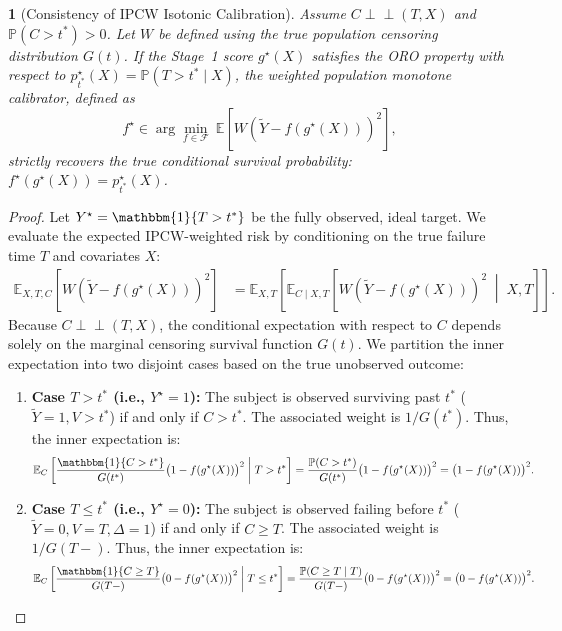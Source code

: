 \documentclass[11pt]{article}
\theoremstyle{plain}
\theoremstyle{plain}
\theoremstyle{plain}
\theoremstyle{plain}
\newtheorem{theorem}{\protect\theoremname}
\theoremstyle{plain}
\theoremstyle{plain}
\theoremstyle{plain}
\providecommand{\theoremname}{Theorem}
\begin{document}
\begin{theorem}[Consistency of IPCW Isotonic Calibration]
\label{thm:ipcw_iso}
Assume $C \perp\!\!\!\perp (T, X)$ and $\mathbb{P}(C > t^*) > 0$. Let $W$ be defined using the true population censoring distribution $G(t)$. If the Stage~1 score $g^\star(X)$ satisfies the ORO property with respect to $p^{\star}_{t^*}(X) = \mathbb{P}(T > t^* \mid X)$, the weighted population monotone calibrator, defined as
\[
f^{\star} \in \arg\min_{f \in \mathcal{F}} \ \mathbb{E}\left[ W \left(\tilde{Y} - f(g^\star(X))\right)^2 \right],
\]
strictly recovers the true conditional survival probability: $f^{\star}(g^\star(X)) = p^{\star}_{t^*}(X)$.
\end{theorem}

\begin{proof}
Let $Y^\star = \mathbbm{1}\{T > t^*\}$ be the fully observed, ideal target. We evaluate the expected IPCW-weighted risk by conditioning on the true failure time $T$ and covariates $X$:
\begin{align*}
    \mathbb{E}_{X, T, C} \left[ W \left(\tilde{Y} - f(g^\star(X))\right)^2 \right] 
    &= \mathbb{E}_{X, T} \left[ \mathbb{E}_{C \mid X, T}\left[ W \left(\tilde{Y} - f(g^\star(X))\right)^2 \;\middle|\; X, T \right] \right].
\end{align*}
Because $C \perp\!\!\!\perp (T, X)$, the conditional expectation with respect to $C$ depends solely on the marginal censoring survival function $G(t)$. We partition the inner expectation into two disjoint cases based on the true unobserved outcome:
\begin{enumerate}
    \item \textbf{Case $T > t^*$ (i.e., $Y^\star = 1$):} The subject is observed surviving past $t^*$ ($\tilde{Y}=1, V > t^*$) if and only if $C > t^*$. The associated weight is $1/G(t^*)$. Thus, the inner expectation is:
    \[
    \mathbb{E}_C \left[ \frac{\mathbbm{1}\{C > t^*\}}{G(t^*)} \big(1 - f(g^\star(X))\big)^2 \;\middle|\; T > t^* \right] = \frac{\mathbb{P}(C > t^*)}{G(t^*)} \big(1 - f(g^\star(X))\big)^2 = \big(1 - f(g^\star(X))\big)^2.
    \]
    \item \textbf{Case $T \le t^*$ (i.e., $Y^\star = 0$):} The subject is observed failing before $t^*$ ($\tilde{Y}=0, V=T, \Delta=1$) if and only if $C \ge T$. The associated weight is $1/G(T-)$. Thus, the inner expectation is:
    \[
    \mathbb{E}_C \left[ \frac{\mathbbm{1}\{C \ge T\}}{G(T-)} \big(0 - f(g^\star(X))\big)^2 \;\middle|\; T \le t^* \right] = \frac{\mathbb{P}(C \ge T \mid T)}{G(T-)} \big(0 - f(g^\star(X))\big)^2 = \big(0 - f(g^\star(X))\big)^2.
\]
\end{enumerate}
\end{proof}
\end{document}
